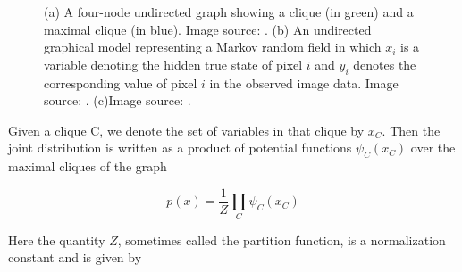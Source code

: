 \documentclass{SMBV12}
\begin{document}
\begin{figure}[htbp]
    \centering
    \caption{(a) A four-node undirected graph showing a clique (in green) and a maximal clique (in blue). Image source: \cite{bishop2006pattern}. (b) An undirected graphical model representing a Markov random field in which $x_i$ is a variable denoting the hidden true state of pixel $i$ and $y_i$ denotes the corresponding value of pixel $i$ in the observed image data. Image source: \cite{bishop2006pattern}. (c)Image source: \cite{shimizu2011automated}.}
\end{figure}

Given a clique C, we denote the set of variables in that clique by $x_C$. Then the joint distribution is written as a product of potential functions $\psi_C(x_C)$ over the maximal cliques of the graph

\begin{equation}
p(x) = \frac{1}{Z} \prod\limits_{C} \psi_C(x_C)
\label{eq:joint_distribution}
\end{equation}

Here the quantity $Z$, sometimes called the partition function, is a normalization constant and is given by
\end{document}
